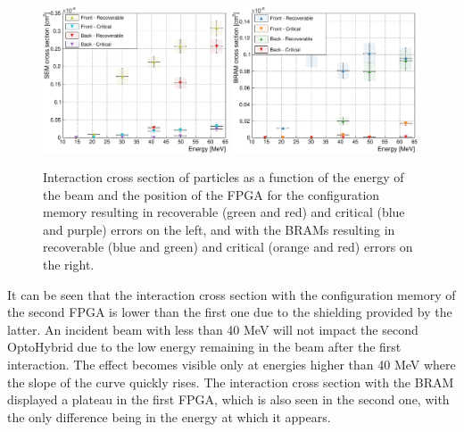       \begin{figure}[h!]
        \centering
        \includegraphics[width=0.49\textwidth]{img/plots/cE_SEU_Comp-crop}
        \includegraphics[width=0.49\textwidth]{img/plots/cE_BRAM_Comp-crop}
        \caption{Interaction cross section of particles as a function of the energy of the beam and the position of the FPGA for the configuration memory resulting in recoverable (green and red) and critical (blue and purple) errors on the left, and with the BRAMs resulting in recoverable (blue and green) and critical (orange and red) errors on the right.}
        \label{fig:II-5-data-seu-comp}
      \end{figure}

      It can be seen that the interaction cross section with the configuration memory of the second FPGA is lower than the first one due to the shielding provided by the latter. An incident beam with less than 40 MeV will not impact the second OptoHybrid due to the low energy remaining in the beam after the first interaction. The effect becomes visible only at energies higher than 40 MeV where the slope of the curve quickly rises. The interaction cross section with the BRAM displayed a plateau in the first FPGA, which is also seen in the second one, with the only difference being in the energy at which it appears. \\

